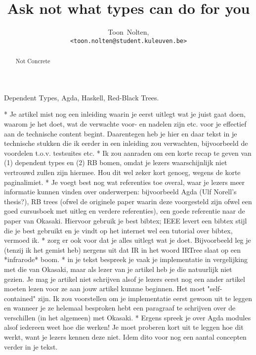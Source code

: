 \documentclass[journal]{../IEEEtemplate/IEEEtran}
\begin{document}
\title{Ask not what types can do for you}
\author{Toon~Nolten,\\ \texttt{<toon.nolten@student.kuleuven.be>}}%
\maketitle


\begin{abstract}
  Not Concrete
\end{abstract}

\begin{IEEEkeywords}
  Dependent Types, Agda, Haskell, Red-Black Trees.
\end{IEEEkeywords}


* Je artikel mist nog een inleiding waarin je eerst uitlegt wat je
juist gaat doen, waarom je het doet, wat de verwachte voor- en nadelen
zijn etc. voor je effectief aan de technische content begint.
Daarentegen heb je hier en daar tekst in je technische stukken die ik
eerder in een inleiding zou verwachten, bijvoorbeeld de voordelen
t.o.v. testsuites etc.
* Ik zou aanraden om een korte recap te geven van (1) dependent types
en (2) RB bomen, omdat je lezers waarschijnlijk niet vertrouwd zullen
zijn hiermee.  Hou dit wel zeker kort genoeg, wegens de korte
paginalimiet.
* Je voegt best nog wat referenties toe overal, waar je lezers meer
informatie kunnen vinden over onderwerpen: bijvoorbeeld Agda (Ulf
Norell's thesis?), RB trees (ofwel de originele paper waarin deze
voorgesteld zijn ofwel een goed cursusboek met uitleg en verdere
referenties), een goede referentie naar de paper van Okasaki. Hiervoor
gebruik je best bibtex; IEEE levert een bibtex stijl die je best
gebruikt en je vindt op het internet wel een tutorial over bibtex,
vermoed ik.
* zorg er ook voor dat je alles uitlegt wat je doet.  Bijvoorbeeld leg
je (tenzij ik het gemist heb) nergens uit dat IR in het woord IRTree
slaat op een *infrarode* boom.
* in je tekst bespreek je vaak je implementatie in vergelijking met
die van Okasaki, maar als lezer van je artikel heb je die natuurlijk
niet gezien.  Je mag je artikel niet schrijven alsof je lezers eerst
nog een ander artikel moeten lezen voor ze aan jouw artikel kunnne
beginnen.  Het moet "self-contained" zijn.  Ik zou voorstellen om je
implementatie eerst gewoon uit te leggen en wanneer je ze helemaal
besproken hebt een paragraaf te schrijven over de verschillen (in het
algemeen) met Okasaki.
* Ergens spreek je over Agda modules alsof iedereen weet hoe die
werken!  Je moet proberen kort uit te leggen hoe dit werkt, want je
lezers kennen deze niet. Idem dito voor nog een aantal concepten
verder in je tekst.
\end{document}
